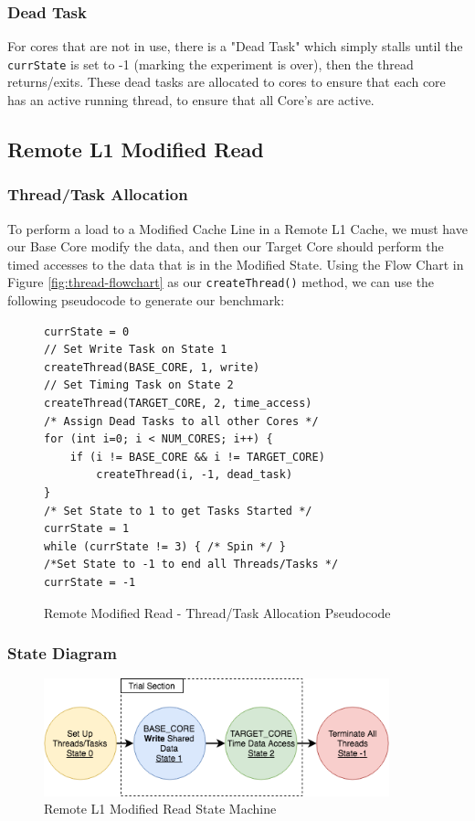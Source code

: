 \documentclass[bsc,frontabs,twoside,singlespacing,parskip,deptreport]{infthesis}     %
\begin{document}
\subsubsection{Dead Task}
For cores that are not in use, there is a "Dead Task" which simply stalls until the \texttt{currState} is set to -1 (marking the experiment is over), then the thread returns/exits. These dead tasks are allocated to cores to ensure that each core has an active running thread, to ensure that all Core's are active.

\subsection{Remote L1 Modified Read}
\subsubsection{Thread/Task Allocation}
To perform a load to a Modified Cache Line in a Remote L1 Cache, we must have our Base Core modify the data, and then our Target Core should perform the timed accesses to the data that is in the Modified State. Using the Flow Chart in Figure \ref{fig:thread-flowchart} as our \texttt{createThread()} method, we can use the following pseudocode to generate our benchmark:

\begin{figure}[!h]
    \centering
    \begin{minipage}{0.7\textwidth}
    \begin{verbatim}
currState = 0
// Set Write Task on State 1
createThread(BASE_CORE, 1, write)
// Set Timing Task on State 2
createThread(TARGET_CORE, 2, time_access)
/* Assign Dead Tasks to all other Cores */
for (int i=0; i < NUM_CORES; i++) {
    if (i != BASE_CORE && i != TARGET_CORE)
        createThread(i, -1, dead_task)
}
/* Set State to 1 to get Tasks Started */
currState = 1
while (currState != 3) { /* Spin */ }
/*Set State to -1 to end all Threads/Tasks */
currState = -1
    \end{verbatim}
    \end{minipage}
    \caption{Remote Modified Read - Thread/Task Allocation Pseudocode}
    \label{fig:remote-M-read-pseudo}
\end{figure}

\newpage
\subsubsection{State Diagram}
\begin{figure}[!h]
    \centering
    \includegraphics[width=100mm]{ModifiedState.png}
    \caption{Remote L1 Modified Read State Machine}
    \label{fig:remote-M-read-state}
\end{figure}
\end{document}
